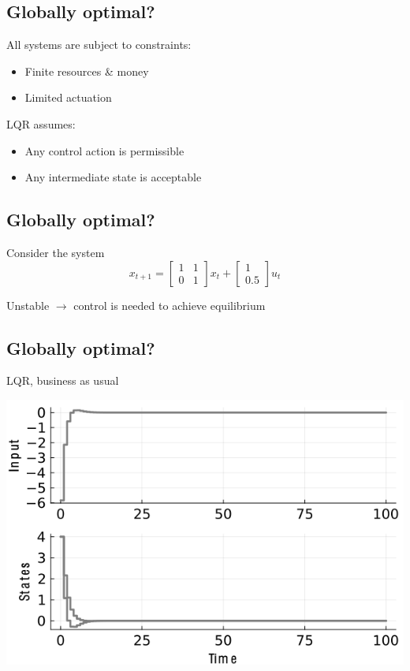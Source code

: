 \documentclass[
  letterpaper,
  DIV=11,
  numbers=noendperiod,
  oneside]{scrartcl}
\providecommand{\tightlist}{%
  \setlength{\itemsep}{0pt}\setlength{\parskip}{0pt}}\usepackage{longtable,booktabs,array}
\begin{document}
\subsection{Globally optimal?}\label{globally-optimal}

All systems are subject to constraints:

\begin{itemize}
\tightlist
\item
  Finite resources \& money
\item
  Limited actuation
\end{itemize}

LQR assumes:

\begin{itemize}
\tightlist
\item
  Any control action is permissible
\item
  Any intermediate state is acceptable
\end{itemize}

\subsection{Globally optimal?}\label{globally-optimal-1}

Consider the system
\[x_{t+1} = \begin{bmatrix} 1 & 1\\ 0 & 1 \end{bmatrix} x_t + \begin{bmatrix} 1 \\ 0.5 \end{bmatrix} u_t\]

Unstable \(\to\) control is needed to achieve equilibrium

\subsection{Globally optimal?}\label{globally-optimal-2}

LQR, business as usual

\begin{center}
\includegraphics{figs/lqr_unconstrained.png}
\end{center}
\end{document}
